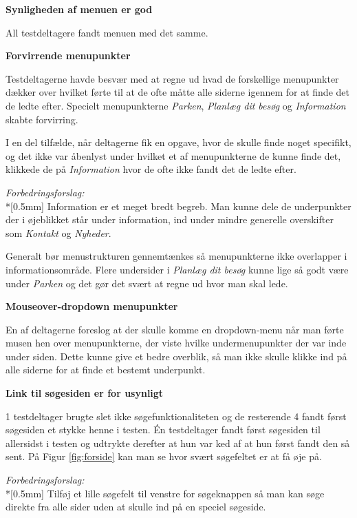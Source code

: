 \documentclass[10pt,a4paper]{article}      %
\newcommand{\kommentar}[2]{\item[#1] \textbf{#2}\par\nopagebreak}{}
\newenvironment{forslag}{\emph{Forbedringsforslag:}\\*[0.5mm]}{}
\newcommand\pic[1]{\texttt{[image: Pics/\#1]}}
\renewcommand\good{\pic{good}}
\renewcommand\goodidea{\pic{goodidea}}
\renewcommand\seriousproblem{\pic{seriousproblem}}
\begin{document}
\begin{kommentarer}

\kommentar{\good}{Synligheden af menuen er god}
All testdeltagere fandt menuen med det samme.

\kommentar{\seriousproblem}{Forvirrende menupunkter}
Testdeltagerne havde besvær med at regne ud hvad de forskellige menupunkter
dækker over hvilket førte til at de ofte måtte alle siderne igennem for at finde
det de ledte efter. Specielt menupunkterne \emph{Parken}, \emph{Planlæg dit
besøg} og \emph{Information} skabte forvirring.

I en del tilfælde, når deltagerne fik en opgave, hvor de skulle finde noget
specifikt, og det ikke var åbenlyst under hvilket et af menupunkterne de kunne
finde det, klikkede de på \emph{Information} hvor de ofte ikke fandt det de
ledte efter.

\begin{forslag}
    Information er et meget bredt begreb. Man kunne dele de underpunkter der i øjeblikket
står under information, ind under mindre generelle overskifter som \emph{Kontakt} og
\emph{Nyheder}.

    Generalt bør menustrukturen gennemtænkes så menupunkterne ikke overlapper i
informationsområde. Flere undersider i \emph{Planlæg dit besøg} kunne lige så godt være under
\emph{Parken} og det gør det svært at regne ud hvor man skal lede.
\end{forslag}

\kommentar{\goodidea}{Mouseover-dropdown menupunkter}

En af deltagerne foreslog at der skulle komme en dropdown-menu når man førte
musen hen over menupunkterne, der viste hvilke undermenupunkter der var inde
under siden. Dette kunne give et bedre overblik, så man ikke skulle klikke ind
på alle siderne for at finde et bestemt underpunkt.

\kommentar{\seriousproblem}{Link til søgesiden er for usynligt}

1 testdeltager brugte slet ikke søgefunktionaliteten og de resterende 4 fandt
først søgesiden et stykke henne i testen. Én testdeltager fandt først søgesiden
til allersidst i testen og udtrykte derefter at hun var ked af at hun først
fandt den så sent. På Figur \ref{fig:forside} kan man se hvor svært søgefeltet
er at få øje på.

\begin{forslag}
Tilføj et lille søgefelt til venstre for søgeknappen så man kan søge direkte fra
alle sider uden at skulle ind på en speciel søgeside.
\end{forslag}



\end{kommentarer}
\end{document}

